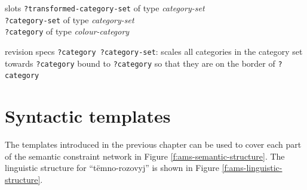 \begin{explanation}{slots}
  \verb+?transformed-category-set+ of type \emph{category-set} \\
  \verb+?category-set+ of type \emph{category-set} \\
  \verb+?category+ of type \emph{colour-category}
\end{explanation}

\begin{explanation}{revision specs}
  \verb+?category ?category-set+: scales all categories in the category
  set towards \verb+?category+ bound to \verb+?category+ so that they
  are on the border of \verb+?category+
\end{explanation}

\section{Syntactic templates}

The templates introduced in the previous chapter can be used to cover
each part of the semantic constraint network in Figure
\ref{f:ams-semantic-structure}. The linguistic structure for
``t\"emno-rozovyj'' is shown in Figure
\ref{f:ams-linguistic-structure}.

